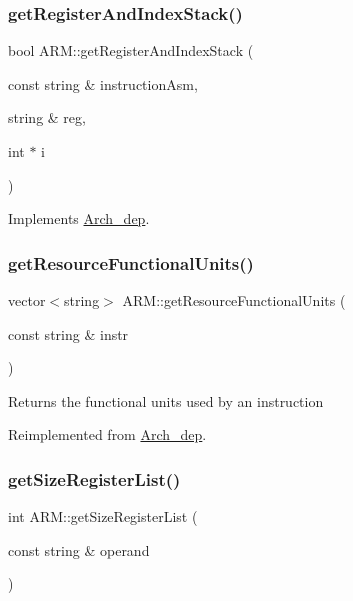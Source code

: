 \subsubsection{\texorpdfstring{get\+Register\+And\+Index\+Stack()}{getRegisterAndIndexStack()}}
{\footnotesize\ttfamily bool A\+R\+M\+::get\+Register\+And\+Index\+Stack (\begin{DoxyParamCaption}\item[{const string \&}]{instruction\+Asm,  }\item[{string \&}]{reg,  }\item[{int $\ast$}]{i }\end{DoxyParamCaption})\hspace{0.3cm}{\ttfamily [virtual]}}



Implements \hyperlink{classArch__dep_a449f2174ec019b4526e1904716d7bae1}{Arch\+\_\+dep}.

\mbox{\label{classARM_a1fa177cc34bbe368167488311b7ab5e5}} 
\subsubsection{\texorpdfstring{get\+Resource\+Functional\+Units()}{getResourceFunctionalUnits()}}
{\footnotesize\ttfamily vector$<$string$>$ A\+R\+M\+::get\+Resource\+Functional\+Units (\begin{DoxyParamCaption}\item[{const string \&}]{instr }\end{DoxyParamCaption})\hspace{0.3cm}{\ttfamily [virtual]}}

Returns the functional units used by an instruction 

Reimplemented from \hyperlink{classArch__dep_a6aa967ba3a9e3cf2954cc376c6ce6a06}{Arch\+\_\+dep}.

\mbox{\label{classARM_a356b1ab7252a6f1183747378a2d66b08}} 
\subsubsection{\texorpdfstring{get\+Size\+Register\+List()}{getSizeRegisterList()}}
{\footnotesize\ttfamily int A\+R\+M\+::get\+Size\+Register\+List (\begin{DoxyParamCaption}\item[{const string \&}]{operand }\end{DoxyParamCaption})\hspace{0.3cm}{\ttfamily [virtual]}}

